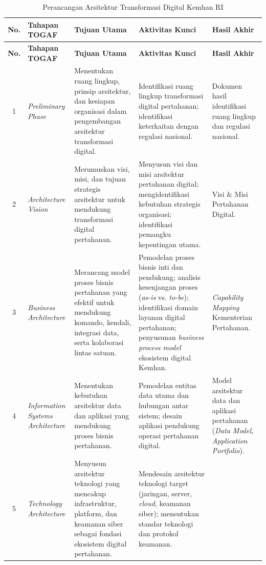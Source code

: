 \begin{longtable}{|c|p{2.4cm}|p{3cm}|p{3.6cm}|p{2.8cm}|}
\caption{Perancangan Arsitektur Transformasi Digital Kemhan RI}
\label{tab:perancangan-arsitektur} \\
\hline
\textbf{No.} & \textbf{Tahapan TOGAF} & \textbf{Tujuan Utama} & \textbf{Aktivitas Kunci} & \textbf{Hasil Akhir} \\
\hline
\endfirsthead

\hline
\textbf{No.} & \textbf{Tahapan TOGAF} & \textbf{Tujuan Utama} & \textbf{Aktivitas Kunci} & \textbf{Hasil Akhir} \\
\hline
\endhead

1 & \textit{Preliminary Phase} & Menentukan ruang lingkup, prinsip arsitektur, dan kesiapan organisasi dalam pengembangan arsitektur transformasi digital.
& Identifikasi ruang lingkup transformasi digital pertahanan; identifikasi keterkaitan dengan regulasi nasional.
& Dokumen hasil identifikasi ruang lingkup dan regulasi nasional. \\
\hline
2 & \textit{Architecture Vision} & Merumuskan visi, misi, dan tujuan strategis arsitektur untuk mendukung transformasi digital pertahanan.
& Menyusun visi dan misi arsitektur pertahanan digital; mengidentifikasi kebutuhan strategis organisasi; identifikasi pemangku kepentingan utama.
& Visi \& Misi Pertahanan Digital. \\
\hline
3 & \textit{Business Architecture} & Merancang model proses bisnis pertahanan yang efektif untuk mendukung komando, kendali, integrasi data, serta kolaborasi lintas satuan.
& Pemodelan proses bisnis inti dan pendukung; analisis kesenjangan proses (\textit{as-is} vs. \textit{to-be}); identifikasi domain layanan digital pertahanan; penyusunan \textit{business process model} ekosistem digital Kemhan.
& \textit{Capability Mapping} Kementerian Pertahanan. \\
\hline
4 & \textit{Information Systems Architecture} & Menentukan kebutuhan arsitektur data dan aplikasi yang mendukung proses bisnis pertahanan.
& Pemodelan entitas data utama dan hubungan antar sistem; desain aplikasi pendukung operasi pertahanan digital.
& Model arsitektur data dan aplikasi pertahanan (\textit{Data Model, Application Portfolio}). \\
\hline
5 & \textit{Technology Architecture} & Menyusun arsitektur teknologi yang mencakup infrastruktur, platform, dan keamanan siber sebagai fondasi ekosistem digital pertahanan.
& Mendesain arsitektur teknologi target (jaringan, server, \textit{cloud}, keamanan siber); menentukan standar teknologi dan protokol keamanan.

\end{longtable}
